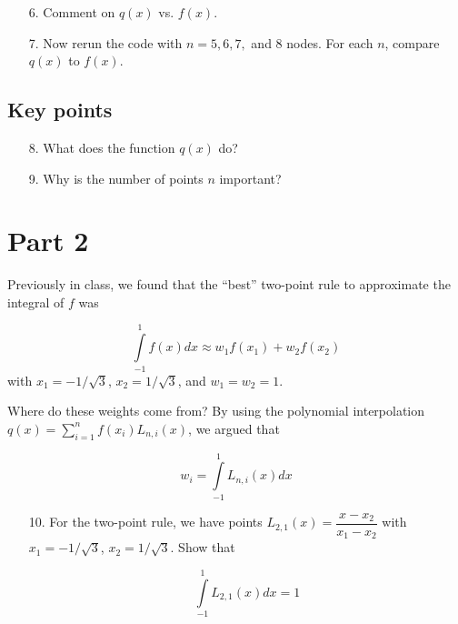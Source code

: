 \documentclass[11pt]{article}
\begin{document}
\begin{enumerate}
\item[6.] Comment on $q(x)$ vs. $f(x)$.

\vspace{2cm}

\item[7.] Now rerun the code with $n=5, 6, 7,$ and $8$ nodes. For each $n$, compare $q(x)$ to $f(x)$.

\vspace{3cm}
\end{enumerate}

\subsection*{Key points}

\begin{enumerate}
\item[8.] What does the function $q(x)$ do?

\vspace{2cm}

\item[9.] Why is the number of points $n$ important?
\end{enumerate}

\newpage

\section*{Part 2}

Previously in class, we found that the ``best'' two-point rule to approximate the integral of $f$ was

$$\int \limits_{-1}^1 f(x) dx \approx w_1 f(x_1) + w_2 f(x_2)$$
with $x_1 = -1/\sqrt{3}$, $x_2 = 1/\sqrt{3}$, and $w_1 = w_2 = 1$. 

\noindent Where do these weights come from? By using the polynomial interpolation $q(x) = \sum \limits_{i=1}^n f(x_i) L_{n,i}(x)$, we argued that

$$w_i = \int \limits_{-1}^1 L_{n,i}(x) dx$$

\begin{enumerate}
\item[10.] For the two-point rule, we have points $L_{2,1}(x) = \dfrac{x - x_2}{x_1 - x_2}$ with $x_1 = -1/\sqrt{3}$, $x_2 = 1/\sqrt{3}$. Show that

$$\int \limits_{-1}^1 L_{2,1}(x) dx = 1$$
\end{enumerate}
\end{document}
